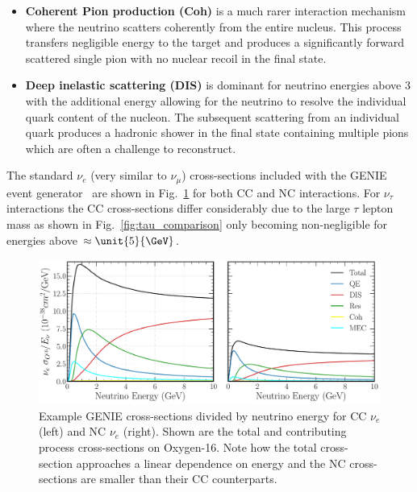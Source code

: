 \begin{itemize}
    \item \textbf{Coherent Pion production (Coh)} is a much rarer interaction mechanism where the
          neutrino scatters coherently from the entire nucleus. This process transfers negligible
          energy to the target and produces a significantly forward scattered single pion with no
          nuclear recoil in the final state.

    \item \textbf{Deep inelastic scattering (DIS)} is dominant for neutrino energies above
          \unit{3}{\GeV} with the additional energy allowing for the neutrino to resolve the
          individual quark content of the nucleon. The subsequent scattering from an individual
          quark produces a hadronic shower in the final state containing multiple pions which are
          often a challenge to reconstruct.
\end{itemize}

The standard $\nu_{e}$ (very similar to $\nu_{\mu}$) cross-sections included with the GENIE event
generator~\cite{andreopoulos2009, andreopoulos2015} are shown in Fig.~\ref{fig:xsec_nu_e_O16} for
both CC and NC interactions. For $\nu_{\tau}$ interactions the CC cross-sections differ
considerably due to the large $\tau$ lepton mass as shown in Fig.~\ref{fig:tau_comparison} only
becoming non-negligible for energies above $\approx\unit{5}{\GeV}$.

\begin{figure} %
    \includegraphics[width=\textwidth]{diagrams/3-theory/xsec_nu_e_O16.pdf}
    \caption[$\nu_{e}$ cross-sections on Oxygen-16]
    {Example GENIE cross-sections divided by neutrino energy for CC $\nu_{e}$ (left) and NC
        $\nu_{e}$ (right). Shown are the total and contributing process cross-sections on
        Oxygen-16. Note how the total cross-section approaches a linear dependence on energy and
        the NC cross-sections are smaller than their CC counterparts.}
    \label{fig:xsec_nu_e_O16}
\end{figure}

